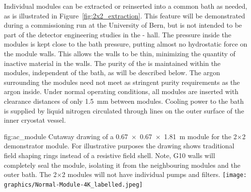 Individual modules can be extracted or reinserted into a common  bath as needed, as is illustrated in Figure~\ref{fig:2x2_extraction}. This feature will be demonstrated during a commissioning run at the University of Bern, but is not intended to be part of the detector engineering studies in the - hall. The pressure inside the modules is kept close to the bath pressure, putting almost no hydrostatic force on the module walls.  This allows the walls to be thin, minimizing the quantity of inactive material in the walls. The purity of the  is maintained within the modules, independent of the bath, as will be described below. The argon surrounding the modules need not meet as stringent purity requirements as the argon inside. Under normal operating conditions, all modules are inserted with  clearance distances of only \SI{1.5}{\milli\metre} between modules. Cooling power to the bath is supplied by liquid nitrogen circulated through lines on the outer surface of the inner cryostat vessel.

\begin{dunefigure}{fig:ac_module}
{Cutaway drawing of a \SI{0.67 x 0.67 x 1.81}{\metre}  module for the 2$\times$2 demonstrator module. For illustrative purposes the drawing shows traditional field shaping rings instead of a resistive field shell. Note, G10 walls will completely seal the module, isolating it from the neighbouring modules and the outer  bath. %
The 2$\times$2 modules will not have individual pumps and filters.}
\texttt{[image: graphics/Normal-Module-4K\_labelled.jpeg]}
\end{dunefigure}

